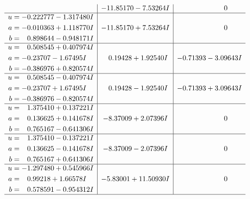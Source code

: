 \documentclass[1p]{elsarticle_modified}
\theoremstyle{definition}
\begin{document}
$$\begin{array}{c|c|c}
 & -11.85170 - 7.53264 I & \phantom{-0.000000 } 0 \\ \hline\begin{aligned}
u &= -0.222777 - 1.317480 I \\
a &= -0.010363 + 1.118770 I \\
b &= \phantom{-}0.898644 - 0.948171 I\end{aligned}
 & -11.85170 + 7.53264 I & \phantom{-0.000000 } 0 \\ \hline\begin{aligned}
u &= \phantom{-}0.508545 + 0.407974 I \\
a &= -0.23707 - 1.67495 I \\
b &= -0.386976 + 0.820574 I\end{aligned}
 & \phantom{-}0.19428 + 1.92540 I & -0.71393 - 3.09643 I \\ \hline\begin{aligned}
u &= \phantom{-}0.508545 - 0.407974 I \\
a &= -0.23707 + 1.67495 I \\
b &= -0.386976 - 0.820574 I\end{aligned}
 & \phantom{-}0.19428 - 1.92540 I & -0.71393 + 3.09643 I \\ \hline\begin{aligned}
u &= \phantom{-}1.375410 + 0.137221 I \\
a &= \phantom{-}0.136625 + 0.141678 I \\
b &= \phantom{-}0.765167 - 0.641306 I\end{aligned}
 & -8.37009 + 2.07396 I & \phantom{-0.000000 } 0 \\ \hline\begin{aligned}
u &= \phantom{-}1.375410 - 0.137221 I \\
a &= \phantom{-}0.136625 - 0.141678 I \\
b &= \phantom{-}0.765167 + 0.641306 I\end{aligned}
 & -8.37009 - 2.07396 I & \phantom{-0.000000 } 0 \\ \hline\begin{aligned}
u &= -1.297480 + 0.545966 I \\
a &= \phantom{-}0.99218 + 1.66578 I \\
b &= \phantom{-}0.578591 - 0.954312 I\end{aligned}
 & -5.83001 + 11.50930 I & \phantom{-0.000000 } 0\\
 \hline 
 \end{array}$$\newpage$$\begin{array}{c|c|c}  

\end{array}$$
\end{document}
